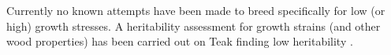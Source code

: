 Currently no known attempts have been made to breed specifically for low (or high) growth stresses. A heritability assessment for growth strains (and other wood properties) has been carried out on Teak finding low heritability \cite{naranjo2012early}.